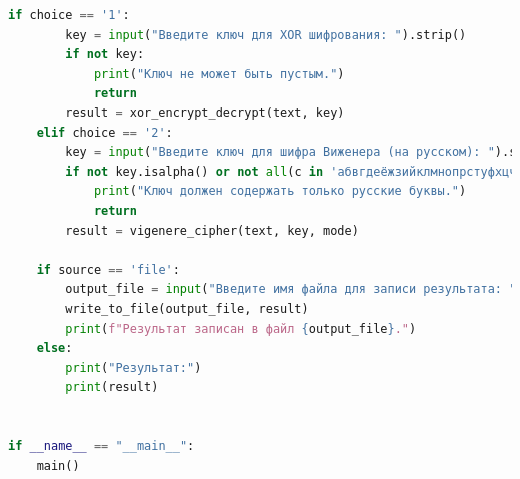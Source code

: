 \documentclass[a4paper, 12pt]{article}
\begin{document}
\begin{lstlisting}[language=python, caption={Код для работы программы по шифрованию}]
    if choice == '1':
        key = input("Введите ключ для XOR шифрования: ").strip()
        if not key:
            print("Ключ не может быть пустым.")
            return
        result = xor_encrypt_decrypt(text, key)
    elif choice == '2':
        key = input("Введите ключ для шифра Виженера (на русском): ").strip()
        if not key.isalpha() or not all(c in 'абвгдеёжзийклмнопрстуфхцчшщъыьэюя' for c in key.lower()):
            print("Ключ должен содержать только русские буквы.")
            return
        result = vigenere_cipher(text, key, mode)

    if source == 'file':
        output_file = input("Введите имя файла для записи результата: ").strip()
        write_to_file(output_file, result)
        print(f"Результат записан в файл {output_file}.")
    else:
        print("Результат:")
        print(result)


if __name__ == "__main__":
    main()
\end{lstlisting}
\end{document}
